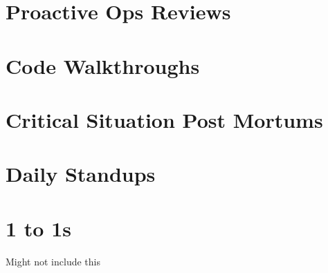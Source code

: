 \section{Proactive Ops Reviews}

\section{Code Walkthroughs}

\section{Critical Situation Post Mortums}

\section{Daily Standups}

\section{1 to 1s}
Might not include this







